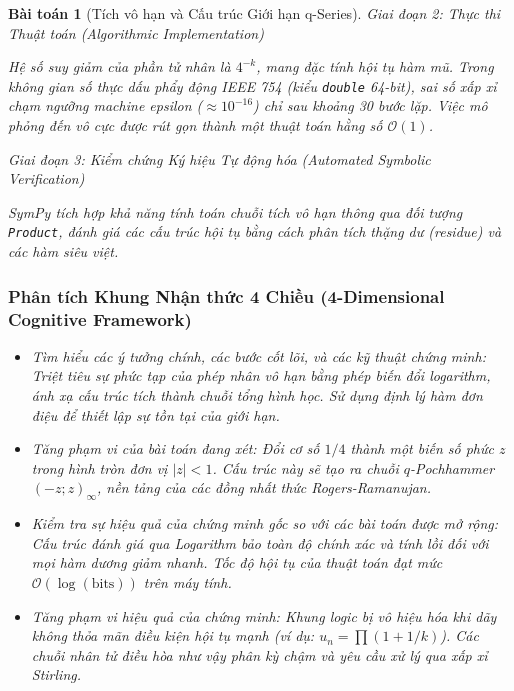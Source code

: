 \documentclass{article}
\newtheorem{baitoan}{Bài toán}
\begin{document}
\begin{baitoan}[Tích vô hạn và Cấu trúc Giới hạn q-Series]
\vspace{0.5em}\noindent\emph{Giai đoạn 2: Thực thi Thuật toán (Algorithmic Implementation)}
 
 Hệ số suy giảm của phần tử nhân là $4^{-k}$, mang đặc tính hội tụ hàm mũ. Trong không gian số thực dấu phẩy động IEEE 754 (kiểu \texttt{double} 64-bit), sai số xấp xỉ chạm ngưỡng machine epsilon ($\approx 10^{-16}$) chỉ sau khoảng 30 bước lặp. Việc mô phỏng đến vô cực được rút gọn thành một thuật toán hằng số $\mathcal{O}(1)$.



\vspace{0.5em}\noindent\emph{Giai đoạn 3: Kiểm chứng Ký hiệu Tự động hóa (Automated Symbolic Verification)}
 
 \textsf{SymPy} tích hợp khả năng tính toán chuỗi tích vô hạn thông qua đối tượng \texttt{Product}, đánh giá các cấu trúc hội tụ bằng cách phân tích thặng dư (residue) và các hàm siêu việt.



 \subsubsection*{Phân tích Khung Nhận thức 4 Chiều (4-Dimensional Cognitive Framework)}
 \begin{itemize}
 \item \textit{Tìm hiểu các ý tưởng chính, các bước cốt lõi, và các kỹ thuật chứng minh}: Triệt tiêu sự phức tạp của phép nhân vô hạn bằng phép biến đổi logarithm, ánh xạ cấu trúc tích thành chuỗi tổng hình học. Sử dụng định lý hàm đơn điệu để thiết lập sự tồn tại của giới hạn.
 \item \textit{Tăng phạm vi của bài toán đang xét}: Đổi cơ số $1/4$ thành một biến số phức $z$ trong hình tròn đơn vị $|z| < 1$. Cấu trúc này sẽ tạo ra chuỗi $q$-Pochhammer $(-z; z)_\infty$, nền tảng của các đồng nhất thức Rogers-Ramanujan.
 \item \textit{Kiểm tra sự hiệu quả của chứng minh gốc so với các bài toán được mở rộng}: Cấu trúc đánh giá qua Logarithm bảo toàn độ chính xác và tính lồi đối với mọi hàm dương giảm nhanh. Tốc độ hội tụ của thuật toán đạt mức $\mathcal{O}(\log(\text{bits}))$ trên máy tính.
 \item \textit{Tăng phạm vi hiệu quả của chứng minh}: Khung logic bị vô hiệu hóa khi dãy không thỏa mãn điều kiện hội tụ mạnh (ví dụ: $u_n = \prod (1 + 1/k)$). Các chuỗi nhân tử điều hòa như vậy phân kỳ chậm và yêu cầu xử lý qua xấp xỉ Stirling.
 \end{itemize}
\end{baitoan}
\end{document}

